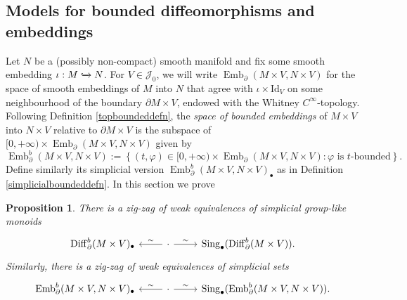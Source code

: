 \documentclass[a4paper, oneside]{amsart}
\newtheorem{proposition}[theorem]{Proposition}
\newcommand{\diff}{\mathrm{Diff}}
\newcommand{\emb}{\operatorname{Emb}}
\newcommand{\Id}{\mathrm{Id}}
\newcommand{\1}{\mathds{1}}
\newcommand{\Sing}{\operatorname{Sing}}
\theoremstyle{remark}
\theoremstyle{definition}
\numberwithin{equation}{section}
\begin{document}
\subsection{Models for bounded diffeomorphisms and embeddings}\label{boundeddifftopmodelsection} Let $N$ be a (possibly non-compact) smooth manifold and fix some smooth embedding $\iota: M\xhookrightarrow{}N$. For $V\in \mathcal J_0$, we will write $\emb_\partial(M\times V,N\times V)$ for the space of smooth embeddings of $M$ into $N$ that agree with $\iota\times \Id_V$ on some neighbourhood of the boundary $\partial M\times V$, endowed with the Whitney $C^\infty$-topology. Following Definition \ref{topboundeddefn}, the \textit{space of bounded embeddings} of $M\times V$ into $N\times V$ relative to $\partial M\times V$ is the subspace of $[0,+\infty)\times \emb_\partial(M\times V,N\times V)$ given by
$$
\emb_\partial^b(M\times V,N\times V):=\left\{
(t,\varphi)\in [0,+\infty)\times \emb_\partial(M\times V,N\times V): \text{$\varphi$ is $t$-bounded}
\right\}.
$$
Define similarly its simplicial version $\emb_\partial^b(M\times V,N\times V)_\bullet$ as in Definition \ref{simplicialboundeddefn}. In this section we prove

\begin{proposition}
\label{myAmazingTheorem}
There is a zig-zag of weak equivalences of simplicial group-like monoids
    $$
    \begin{tikzcd}
       \diff^b_\partial(M\times V)_\bullet&\lar["\sim"']\cdot \rar["\sim"]&\Sing_\bullet(\diff_\partial^b(M\times V)).
    \end{tikzcd}
    $$
    Similarly, there is a zig-zag of weak equivalences of simplicial sets
    $$
    \begin{tikzcd}
       \emb^b_\partial(M\times V, N\times V)_\bullet&\lar["\sim"']\cdot \rar["\sim"]&\Sing_\bullet(\emb_\partial^b(M\times V, N\times V)).
    \end{tikzcd}
    $$
\end{proposition}
\end{document}
